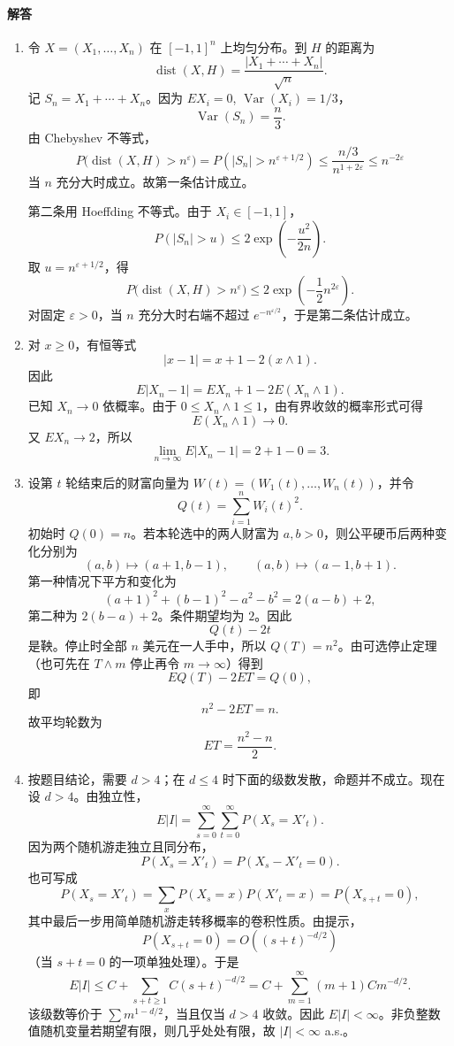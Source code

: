 \documentclass[UTF8,12pt]{ctexart}
\begin{document}
\paragraph{解答}
\begin{enumerate}[label=\textbf{\arabic*.},leftmargin=2.2em]
\item 令 \(X=(X_1,\ldots,X_n)\) 在 \([-1,1]^n\) 上均匀分布。到 \(H\) 的距离为
\[
\operatorname{dist}(X,H)=\frac{|X_1+\cdots+X_n|}{\sqrt n}.
\]
记 \(S_n=X_1+\cdots+X_n\)。因为 \(E X_i=0\), \(\operatorname{Var}(X_i)=1/3\)，
\[
\operatorname{Var}(S_n)=\frac n3.
\]
由 Chebyshev 不等式，
\[
P\bigl(\operatorname{dist}(X,H)>n^\varepsilon\bigr)
=P(|S_n|>n^{\varepsilon+1/2})
\le \frac{n/3}{n^{1+2\varepsilon}}
\le n^{-2\varepsilon}
\]
当 \(n\) 充分大时成立。故第一条估计成立。

第二条用 Hoeffding 不等式。由于 \(X_i\in[-1,1]\)，
\[
P(|S_n|>u)\le 2\exp\left(-\frac{u^2}{2n}\right).
\]
取 \(u=n^{\varepsilon+1/2}\)，得
\[
P\bigl(\operatorname{dist}(X,H)>n^\varepsilon\bigr)
\le 2\exp\left(-\frac12n^{2\varepsilon}\right).
\]
对固定 \(\varepsilon>0\)，当 \(n\) 充分大时右端不超过 \(e^{-n^{\varepsilon/2}}\)，于是第二条估计成立。

\item 对 \(x\ge0\)，有恒等式
\[
|x-1|=x+1-2(x\wedge1).
\]
因此
\[
E|X_n-1|=E X_n+1-2E(X_n\wedge1).
\]
已知 \(X_n\to0\) 依概率。由于 \(0\le X_n\wedge1\le1\)，由有界收敛的概率形式可得
\[
E(X_n\wedge1)\to0.
\]
又 \(E X_n\to2\)，所以
\[
\lim_{n\to\infty}E|X_n-1|=2+1-0=3.
\]

\item 设第 \(t\) 轮结束后的财富向量为 \(W(t)=(W_1(t),\ldots,W_n(t))\)，并令
\[
Q(t)=\sum_{i=1}^n W_i(t)^2.
\]
初始时 \(Q(0)=n\)。若本轮选中的两人财富为 \(a,b>0\)，则公平硬币后两种变化分别为
\[
(a,b)\mapsto(a+1,b-1),\qquad (a,b)\mapsto(a-1,b+1).
\]
第一种情况下平方和变化为
\[
(a+1)^2+(b-1)^2-a^2-b^2=2(a-b)+2,
\]
第二种为 \(2(b-a)+2\)。条件期望均为 \(2\)。因此
\[
Q(t)-2t
\]
是鞅。停止时全部 \(n\) 美元在一人手中，所以 \(Q(T)=n^2\)。由可选停止定理（也可先在 \(T\wedge m\) 停止再令 \(m\to\infty\)）得到
\[
E Q(T)-2E T=Q(0),
\]
即
\[
n^2-2E T=n.
\]
故平均轮数为
\[
E T=\frac{n^2-n}{2}.
\]

\item 按题目结论，需要 \(d>4\)；在 \(d\le4\) 时下面的级数发散，命题并不成立。现在设 \(d>4\)。由独立性，
\[
E|I|=\sum_{s=0}^\infty\sum_{t=0}^\infty P(X_s=X'_t).
\]
因为两个随机游走独立且同分布，
\[
P(X_s=X'_t)=P(X_s-X'_t=0).
\]
也可写成
\[
P(X_s=X'_t)=\sum_x P(X_s=x)P(X'_t=x)
=P(X_{s+t}=0),
\]
其中最后一步用简单随机游走转移概率的卷积性质。由提示，
\[
P(X_{s+t}=0)=O((s+t)^{-d/2})
\]
（当 \(s+t=0\) 的一项单独处理）。于是
\[
E|I|
\le C+\sum_{s+t\ge1}C(s+t)^{-d/2}
=C+\sum_{m=1}^\infty (m+1)C m^{-d/2}.
\]
该级数等价于 \(\sum m^{1-d/2}\)，当且仅当 \(d>4\) 收敛。因此 \(E|I|<\infty\)。非负整数值随机变量若期望有限，则几乎处处有限，故 \(|I|<\infty\) a.s.。


\end{enumerate}
\end{document}
